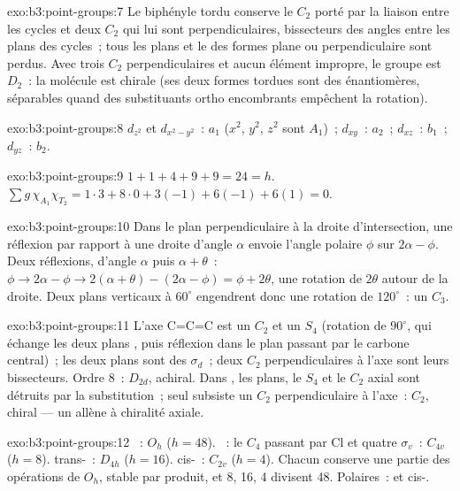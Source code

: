 \begin{solution}{exo:b3:point-groups:7}
Le biphényle tordu conserve le $C_2$ porté par la liaison entre les
cycles et deux $C_2$ qui lui sont perpendiculaires, bissecteurs des
angles entre les plans des cycles~; tous les plans et le  des formes plane ou perpendiculaire sont perdus. Avec trois
$C_2$ perpendiculaires et aucun élément impropre, le groupe est
$D_2$~: la molécule est chirale (ses deux formes tordues sont des
énantiomères, séparables quand des substituants ortho encombrants
empêchent la rotation).
\end{solution}

\begin{solution}{exo:b3:point-groups:8}
$d_{z^2}$ et $d_{x^2-y^2}$~: $a_1$ ($x^2$, $y^2$, $z^2$ sont $A_1$)~; $d_{xy}$~: $a_2$~; $d_{xz}$~:
$b_1$~; $d_{yz}$~: $b_2$.
\end{solution}

\begin{solution}{exo:b3:point-groups:9}
$1 + 1 + 4 + 9 + 9 = 24 = h$. $\sum g\,\chi_{A_1}\chi_{T_2} = 1\cdot3 + 8\cdot0 + 3(-1)
+ 6(-1) + 6(1) = 0$.
\end{solution}

\begin{solution}{exo:b3:point-groups:10}
Dans le plan perpendiculaire à la droite d'intersection, une réflexion
par rapport à une droite d'angle $\alpha$ envoie l'angle polaire $\phi$
sur $2\alpha - \phi$. Deux réflexions, d'angle
$\alpha$ puis $\alpha + \theta$~: $\phi \to 2\alpha - \phi \to 2(\alpha + \theta) - (2\alpha - \phi) =
\phi + 2\theta$, une rotation de $2\theta$ autour de la droite. Deux plans
verticaux à
$60^\circ$ engendrent donc une rotation de $120^\circ$~: un $C_3$.
\end{solution}

\begin{solution}{exo:b3:point-groups:11}
L'axe C=C=C est un $C_2$ et un $S_4$ (rotation de $90^\circ$, qui échange
les deux plans , puis réflexion dans le plan passant par le
carbone central)~; les deux
plans  sont des $\sigma_d$~; deux $C_2$ perpendiculaires à l'axe
sont leurs bissecteurs.
Ordre 8~: $D_{2d}$, achiral. Dans , les plans, le $S_4$ et le $C_2$
axial sont détruits par la substitution~; seul subsiste un $C_2$
perpendiculaire à l'axe~: $C_2$, chiral --- un allène à chiralité axiale.
\end{solution}

\begin{solution}{exo:b3:point-groups:12}
~: $O_h$ ($h = 48$). ~: le $C_4$ passant par Cl et quatre $\sigma_v$~:
$C_{4v}$ ($h = 8$). trans-~: $D_{4h}$ ($h = 16$). cis-~: $C_{2v}$ ($h
= 4$). Chacun conserve une partie des opérations de $O_h$, stable par
produit, et 8, 16, 4 divisent 48. Polaires~:  et
cis-.
\end{solution}

